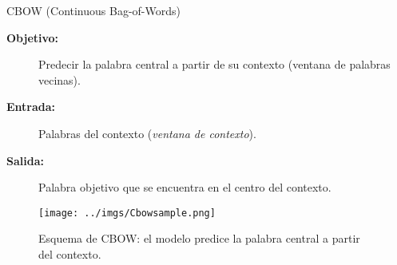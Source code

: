 \documentclass{beamer}
\begin{document}
%  
%    
% 
%  


\begin{frame}{CBOW (Continuous Bag-of-Words)}
  \begin{description}
    \item[\textbf{Objetivo:}] Predecir la palabra central a partir de su contexto (ventana de palabras vecinas).
    \item[\textbf{Entrada:}] Palabras del contexto (\textit{ventana de contexto}).
    \item[\textbf{Salida:}] Palabra objetivo que se encuentra en el centro del contexto.
  \end{description}


  \begin{figure}
    \centering
    \texttt{[image: ../imgs/Cbowsample.png]}
    \caption*{Esquema de CBOW: el modelo predice la palabra central a partir del contexto.}
  \end{figure}
\end{frame}
\end{document}
